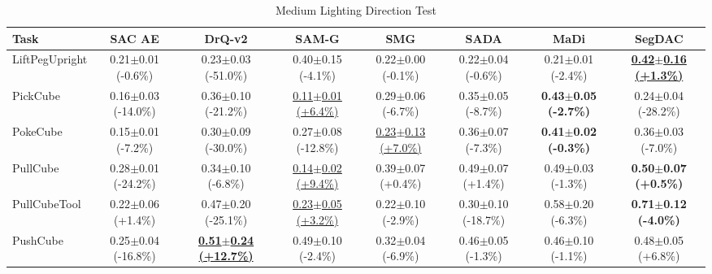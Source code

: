 \begin{table}[htbp]
\centering
\scriptsize
\caption{Medium Lighting Direction Test}
\label{tab:appendix_lightingdirectiontest_medium}
\begin{adjustbox}{max width=\textwidth}
\begin{tabular}{l*{7}{c}}
\toprule
\textbf{Task} & \textbf{SAC AE} & \textbf{DrQ-v2} & \textbf{SAM-G} & \textbf{SMG} & \textbf{SADA} & \textbf{MaDi} & \textbf{SegDAC} \\
\midrule
LiftPegUpright & 0.21$\pm$0.01 \scriptsize{(-0.6\%)} & 0.23$\pm$0.03 \scriptsize{(-51.0\%)} & 0.40$\pm$0.15 \scriptsize{(-4.1\%)} & 0.22$\pm$0.00 \scriptsize{(-0.1\%)} & 0.22$\pm$0.04 \scriptsize{(-0.6\%)} & 0.21$\pm$0.01 \scriptsize{(-2.4\%)} & \textbf{\underline{0.42$\pm$0.16 \scriptsize{(+1.3\%)}}} \\
PickCube & 0.16$\pm$0.03 \scriptsize{(-14.0\%)} & 0.36$\pm$0.10 \scriptsize{(-21.2\%)} & \underline{0.11$\pm$0.01 \scriptsize{(+6.4\%)}} & 0.29$\pm$0.06 \scriptsize{(-6.7\%)} & 0.35$\pm$0.05 \scriptsize{(-8.7\%)} & \textbf{0.43$\pm$0.05 \scriptsize{(-2.7\%)}} & 0.24$\pm$0.04 \scriptsize{(-28.2\%)} \\
PokeCube & 0.15$\pm$0.01 \scriptsize{(-7.2\%)} & 0.30$\pm$0.09 \scriptsize{(-30.0\%)} & 0.27$\pm$0.08 \scriptsize{(-12.8\%)} & \underline{0.23$\pm$0.13 \scriptsize{(+7.0\%)}} & 0.36$\pm$0.07 \scriptsize{(-7.3\%)} & \textbf{0.41$\pm$0.02 \scriptsize{(-0.3\%)}} & 0.36$\pm$0.03 \scriptsize{(-7.0\%)} \\
PullCube & 0.28$\pm$0.01 \scriptsize{(-24.2\%)} & 0.34$\pm$0.10 \scriptsize{(-6.8\%)} & \underline{0.14$\pm$0.02 \scriptsize{(+9.4\%)}} & 0.39$\pm$0.07 \scriptsize{(+0.4\%)} & 0.49$\pm$0.07 \scriptsize{(+1.4\%)} & 0.49$\pm$0.03 \scriptsize{(-1.3\%)} & \textbf{0.50$\pm$0.07 \scriptsize{(+0.5\%)}} \\
PullCubeTool & 0.22$\pm$0.06 \scriptsize{(+1.4\%)} & 0.47$\pm$0.20 \scriptsize{(-25.1\%)} & \underline{0.23$\pm$0.05 \scriptsize{(+3.2\%)}} & 0.22$\pm$0.10 \scriptsize{(-2.9\%)} & 0.30$\pm$0.10 \scriptsize{(-18.7\%)} & 0.58$\pm$0.20 \scriptsize{(-6.3\%)} & \textbf{0.71$\pm$0.12 \scriptsize{(-4.0\%)}} \\
PushCube & 0.25$\pm$0.04 \scriptsize{(-16.8\%)} & \textbf{\underline{0.51$\pm$0.24 \scriptsize{(+12.7\%)}}} & 0.49$\pm$0.10 \scriptsize{(-2.4\%)} & 0.32$\pm$0.04 \scriptsize{(-6.9\%)} & 0.46$\pm$0.05 \scriptsize{(-1.3\%)} & 0.46$\pm$0.10 \scriptsize{(-1.1\%)} & 0.48$\pm$0.05 \scriptsize{(+6.8\%)} \\

\end{tabular}
\end{adjustbox}
\end{table}
